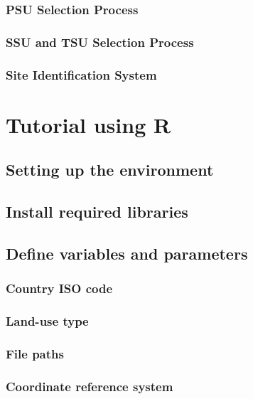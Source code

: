 \documentclass[
  10pt,
  b5paper,
  oneside]{book}
\begin{document}
\subsubsection{PSU Selection Process}\label{psu-selection-process}

\subsubsection{SSU and TSU Selection Process}\label{ssu-tsu-selection}

\subsubsection{Site Identification System}\label{site-id}

\section{Tutorial using R}\label{tutorial}

\subsection{Setting up the environment}\label{setup}

\subsection{Install required libraries}\label{install-libraries}

\subsection{Define variables and parameters}\label{define-parameters}

\subsubsection{Country ISO code}\label{country-iso-code}

\subsubsection{Land-use type}\label{land-use-type}

\subsubsection{File paths}\label{file-paths}

\subsubsection{Coordinate reference system}\label{coordinate-reference-system}
\end{document}
